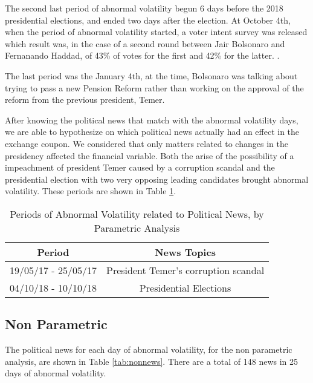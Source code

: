 \documentclass[a4paper]{article}
\begin{document}
The second last period of abnormal volatility begun 6 days before the 2018 presidential elections, and ended two days after the election. At October 4th, when the period of abnormal volatility started, a voter intent survey was released which result was, in the case of a second round between Jair Bolsonaro and Fernanando Haddad, of 43\% of votes for the first and 42\% for the latter. .

The last period was the January 4th, at the time, Bolsonaro was talking about trying to pass a new Pension Reform rather than working on the approval of the reform from the previous president, Temer.

After knowing the political news that match with the abnormal volatility days, we are able to hypothesize on which political news actually had an effect in the exchange coupon. We considered that only matters related to changes in the presidency affected the financial variable. Both the arise of the possibility of a impeachment of president Temer caused by a corruption scandal and the presidential election with two very opposing leading candidates brought abnormal volatility. These periods are shown in Table \ref{tab:respar}.

\begin{table}[H]
\caption{Periods of Abnormal Volatility related to Political News, by Parametric Analysis}
\label{tab:respar}
\centering
\begin{tabular}{| c | c |}
\hline
Period & News Topics \\
\hline \hline
19/05/17 - 25/05/17 & President Temer's corruption scandal \\
\hline
04/10/18 - 10/10/18 & Presidential Elections \\
\hline
\end{tabular}
\end{table}


\subsection{Non Parametric}

The political news for each day of abnormal volatility, for the non parametric analysis, are shown in Table \ref{tab:nonnews}. There are a total of 148 news in 25 days of abnormal volatility.
\end{document}
